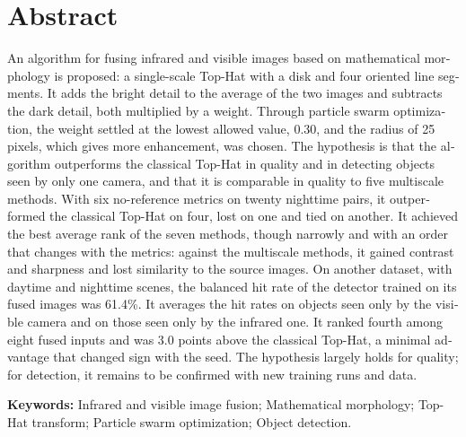 \chapter*{Abstract}
{}

\begin{otherlanguage}{english}

An algorithm for fusing infrared and visible images based on mathematical morphology is proposed: a
single-scale Top-Hat with a disk and four oriented line segments. It adds the bright detail to the average
of the two images and subtracts the dark detail, both multiplied by a weight. Through particle swarm
optimization, the weight settled at the lowest allowed value, 0.30, and the radius of 25 pixels, which
gives more enhancement, was chosen. The hypothesis is that the algorithm outperforms the classical Top-Hat
in quality and in detecting objects seen by only one camera, and that it is comparable in quality to five
multiscale methods. With six no-reference metrics on twenty nighttime pairs, it outperformed the classical
Top-Hat on four, lost on one and tied on another. It achieved the best average rank of the seven methods,
though narrowly and with an order that changes with the metrics: against the multiscale methods, it gained
contrast and sharpness and lost similarity to the source images. On another dataset, with daytime and
nighttime scenes, the balanced hit rate of the detector trained on its fused images was 61.4\%. It averages the
hit rates on objects seen only by the visible camera and on those seen only by the infrared one. It ranked
fourth among eight fused inputs and was 3.0 points above the classical Top-Hat, a minimal advantage that
changed sign with the seed. The hypothesis largely holds for quality; for detection, it remains to be
confirmed with new training runs and data.

\textbf{Keywords:} Infrared and visible image fusion; Mathematical morphology; Top-Hat transform;
Particle swarm optimization; Object detection.

\end{otherlanguage}
